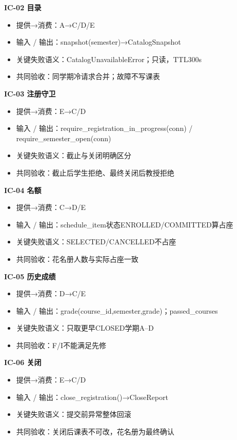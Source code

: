 \documentclass[UTF8,11pt,a4paper]{ctexart}
\providecommand{\tightlist}{\setlength{\itemsep}{0pt}\setlength{\parskip}{0pt}}
\begin{document}
\textbf{IC-02 目录}

\begin{itemize}
\tightlist
\item
  提供→消费：A→C/D/E
\item
  输入 / 输出：snapshot(semester)→CatalogSnapshot
\item
  关键失败语义：CatalogUnavailableError；只读，TTL300s
\item
  共同验收：同学期冷请求合并；故障不写课表
\end{itemize}

\textbf{IC-03 注册守卫}

\begin{itemize}
\tightlist
\item
  提供→消费：E→C/D
\item
  输入 / 输出：require\_\allowbreak{}registration\_\allowbreak{}in\_\allowbreak{}progress(conn) /
  require\_\allowbreak{}semester\_\allowbreak{}open(conn)
\item
  关键失败语义：截止与关闭明确区分
\item
  共同验收：截止后学生拒绝、最终关闭后教授拒绝
\end{itemize}

\textbf{IC-04 名额}

\begin{itemize}
\tightlist
\item
  提供→消费：C→D/E
\item
  输入 / 输出：schedule\_\allowbreak{}item状态ENROLLED/COMMITTED算占座
\item
  关键失败语义：SELECTED/CANCELLED不占座
\item
  共同验收：花名册人数与实际占座一致
\end{itemize}

\textbf{IC-05 历史成绩}

\begin{itemize}
\tightlist
\item
  提供→消费：D→C/E
\item
  输入 / 输出：grade(course\_\allowbreak{}id,semester,grade)；passed\_\allowbreak{}courses
\item
  关键失败语义：只取更早CLOSED学期A--D
\item
  共同验收：F/I不能满足先修
\end{itemize}

\textbf{IC-06 关闭}

\begin{itemize}
\tightlist
\item
  提供→消费：E→C/D
\item
  输入 / 输出：close\_\allowbreak{}registration()→CloseReport
\item
  关键失败语义：提交前异常整体回滚
\item
  共同验收：关闭后课表不可改，花名册为最终确认
\end{itemize}
\end{document}
